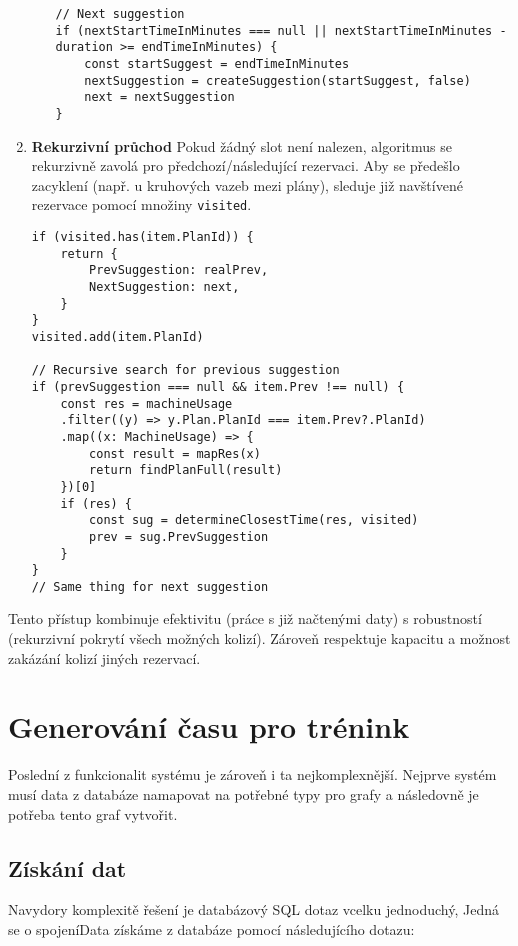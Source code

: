 \begin{enumerate}
\begin{itemize}
\begin{lstlisting}
// Next suggestion
if (nextStartTimeInMinutes === null || nextStartTimeInMinutes - duration >= endTimeInMinutes) {
    const startSuggest = endTimeInMinutes
    nextSuggestion = createSuggestion(startSuggest, false)
    next = nextSuggestion
}
    \end{lstlisting}
    \end{itemize}

    \item \textbf{Rekurzivní průchod}
    Pokud žádný slot není nalezen, algoritmus se rekurzivně zavolá pro předchozí/následující rezervaci. Aby se předešlo zacyklení (např. u kruhových vazeb mezi plány), sleduje již navštívené rezervace pomocí množiny \texttt{visited}.

    \begin{lstlisting}
if (visited.has(item.PlanId)) {
    return {
	    PrevSuggestion: realPrev,
	    NextSuggestion: next,
    }
}
visited.add(item.PlanId)

// Recursive search for previous suggestion
if (prevSuggestion === null && item.Prev !== null) {
    const res = machineUsage
	.filter((y) => y.Plan.PlanId === item.Prev?.PlanId)
	.map((x: MachineUsage) => {
	    const result = mapRes(x)
	    return findPlanFull(result)
	})[0]
    if (res) {
	    const sug = determineClosestTime(res, visited)
	    prev = sug.PrevSuggestion
    }
}
// Same thing for next suggestion
    \end{lstlisting}
\end{enumerate}

Tento přístup kombinuje efektivitu (práce s již načtenými daty) s robustností (rekurzivní pokrytí všech možných kolizí). Zároveň respektuje kapacitu a možnost zakázání kolizí jiných rezervací. 
\section{Generování času pro trénink}

Poslední z funkcionalit systému je zároveň i ta nejkomplexnější. Nejprve systém musí data z databáze namapovat na potřebné typy pro grafy a následovně je potřeba tento graf vytvořit.

\subsection{Získání dat}
Navydory komplexitě řešení je databázový SQL dotaz vcelku jednoduchý, Jedná se o spojeníData získáme z databáze pomocí následujícího dotazu:

